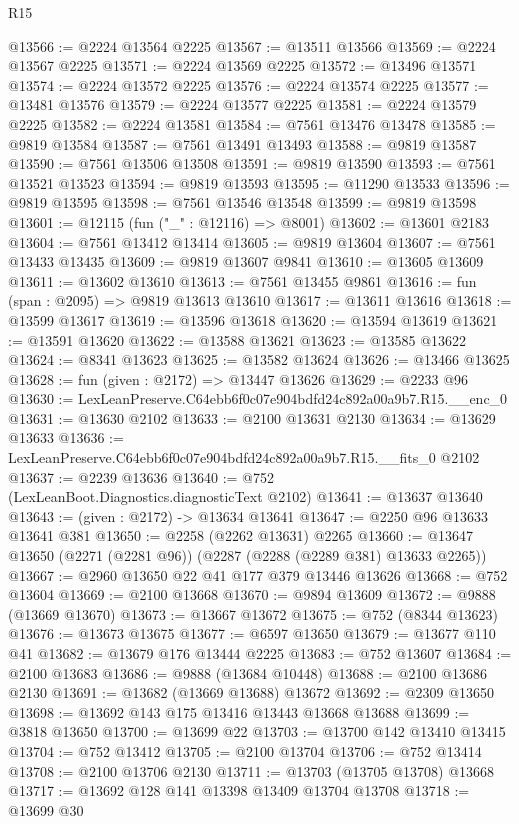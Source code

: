 \begin{lexlean}{R15}
\begin{coremodule}
@13566 := @2224 @13564 @2225
@13567 := @13511 @13566
@13569 := @2224 @13567 @2225
@13571 := @2224 @13569 @2225
@13572 := @13496 @13571
@13574 := @2224 @13572 @2225
@13576 := @2224 @13574 @2225
@13577 := @13481 @13576
@13579 := @2224 @13577 @2225
@13581 := @2224 @13579 @2225
@13582 := @2224 @13581
@13584 := @7561 @13476 @13478
@13585 := @9819 @13584
@13587 := @7561 @13491 @13493
@13588 := @9819 @13587
@13590 := @7561 @13506 @13508
@13591 := @9819 @13590
@13593 := @7561 @13521 @13523
@13594 := @9819 @13593
@13595 := @11290 @13533
@13596 := @9819 @13595
@13598 := @7561 @13546 @13548
@13599 := @9819 @13598
@13601 := @12115 (fun ("_" : @12116) => @8001)
@13602 := @13601 @2183
@13604 := @7561 @13412 @13414
@13605 := @9819 @13604
@13607 := @7561 @13433 @13435
@13609 := @9819 @13607 @9841
@13610 := @13605 @13609
@13611 := @13602 @13610
@13613 := @7561 @13455 @9861
@13616 := fun (span : @2095) => @9819 @13613 @13610
@13617 := @13611 @13616
@13618 := @13599 @13617
@13619 := @13596 @13618
@13620 := @13594 @13619
@13621 := @13591 @13620
@13622 := @13588 @13621
@13623 := @13585 @13622
@13624 := @8341 @13623
@13625 := @13582 @13624
@13626 := @13466 @13625
@13628 := fun (given : @2172) => @13447 @13626
@13629 := @2233 @96
@13630 := LexLeanPreserve.C64ebb6f0c07e904bdfd24c892a00a9b7.R15.__enc_0
@13631 := @13630 @2102
@13633 := @2100 @13631 @2130
@13634 := @13629 @13633
@13636 := LexLeanPreserve.C64ebb6f0c07e904bdfd24c892a00a9b7.R15.__fits_0 @2102
@13637 := @2239 @13636
@13640 := @752 (LexLeanBoot.Diagnostics.diagnosticText @2102)
@13641 := @13637 @13640
@13643 := (given : @2172) -> @13634 @13641
@13647 := @2250 @96 @13633 @13641 @381
@13650 := @2258 (@2262 @13631) @2265
@13660 := @13647 @13650 (@2271 (@2281 @96)) (@2287 (@2288 (@2289 @381) @13633 @2265))
@13667 := @2960 @13650 @22 @41 @177 @379 @13446 @13626
@13668 := @752 @13604
@13669 := @2100 @13668
@13670 := @9894 @13609
@13672 := @9888 (@13669 @13670)
@13673 := @13667 @13672
@13675 := @752 (@8344 @13623)
@13676 := @13673 @13675
@13677 := @6597 @13650
@13679 := @13677 @110 @41
@13682 := @13679 @176 @13444 @2225
@13683 := @752 @13607
@13684 := @2100 @13683
@13686 := @9888 (@13684 @10448)
@13688 := @2100 @13686 @2130
@13691 := @13682 (@13669 @13688) @13672
@13692 := @2309 @13650
@13698 := @13692 @143 @175 @13416 @13443 @13668 @13688
@13699 := @3818 @13650
@13700 := @13699 @22
@13703 := @13700 @142 @13410 @13415
@13704 := @752 @13412
@13705 := @2100 @13704
@13706 := @752 @13414
@13708 := @2100 @13706 @2130
@13711 := @13703 (@13705 @13708) @13668
@13717 := @13692 @128 @141 @13398 @13409 @13704 @13708
@13718 := @13699 @30

\end{coremodule}
\end{lexlean}
